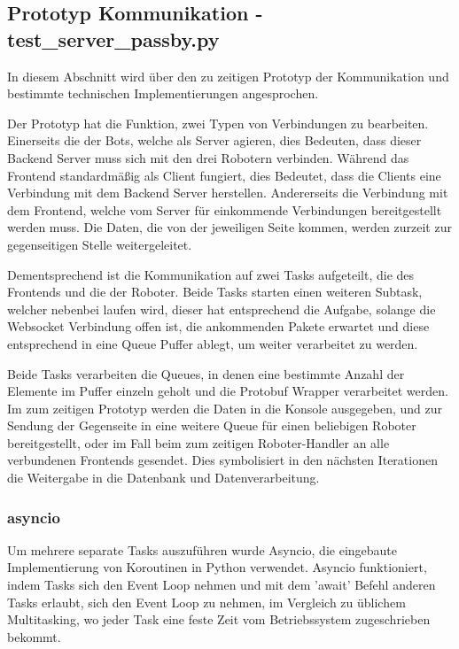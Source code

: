 \subsection{Prototyp Kommunikation - test\_server\_passby.py}
In diesem Abschnitt wird über den zu zeitigen Prototyp der Kommunikation 
und bestimmte technischen Implementierungen angesprochen.

Der Prototyp hat die Funktion, zwei Typen von Verbindungen zu bearbeiten.
% 
Einerseits die der Bots, welche als Server agieren, 
dies Bedeuten, dass dieser Backend Server muss sich mit den drei Robotern verbinden.
Während das Frontend standardmäßig als Client fungiert, 
dies Bedeutet, dass die Clients eine Verbindung mit dem Backend Server herstellen.
% 
Andererseits die Verbindung mit dem Frontend, 
welche vom Server für einkommende Verbindungen bereitgestellt werden muss.
% 
Die Daten, die von der jeweiligen Seite kommen, 
werden zurzeit zur gegenseitigen Stelle weitergeleitet.

Dementsprechend ist die Kommunikation auf zwei Tasks aufgeteilt,
die des Frontends und die der Roboter.
Beide Tasks starten einen weiteren Subtask, welcher nebenbei laufen wird, 
dieser hat entsprechend die Aufgabe, solange die Websocket Verbindung offen ist,
die ankommenden Pakete erwartet und diese entsprechend in eine Queue Puffer ablegt, 
um weiter verarbeitet zu werden. 

Beide Tasks verarbeiten die Queues, 
in denen eine bestimmte Anzahl der Elemente im Puffer 
einzeln geholt und die Protobuf Wrapper verarbeitet werden.
% 
Im zum zeitigen Prototyp werden die Daten in die Konsole ausgegeben,
und zur Sendung der Gegenseite in eine weitere Queue 
für einen beliebigen Roboter bereitgestellt, 
oder im Fall beim zum zeitigen Roboter-Handler 
an alle verbundenen Frontends gesendet.
% 
Dies symbolisiert in den nächsten Iterationen die Weitergabe 
in die Datenbank und Datenverarbeitung.


\subsubsection{asyncio}
Um mehrere separate Tasks auszuführen wurde Asyncio,
die eingebaute Implementierung von Koroutinen in Python verwendet.
% 
Asyncio funktioniert, indem Tasks sich den Event Loop nehmen und mit dem 'await' 
Befehl anderen Tasks erlaubt, sich den Event Loop zu nehmen, 
im Vergleich zu üblichem Multitasking,
wo jeder Task eine feste Zeit vom Betriebssystem zugeschrieben bekommt.

